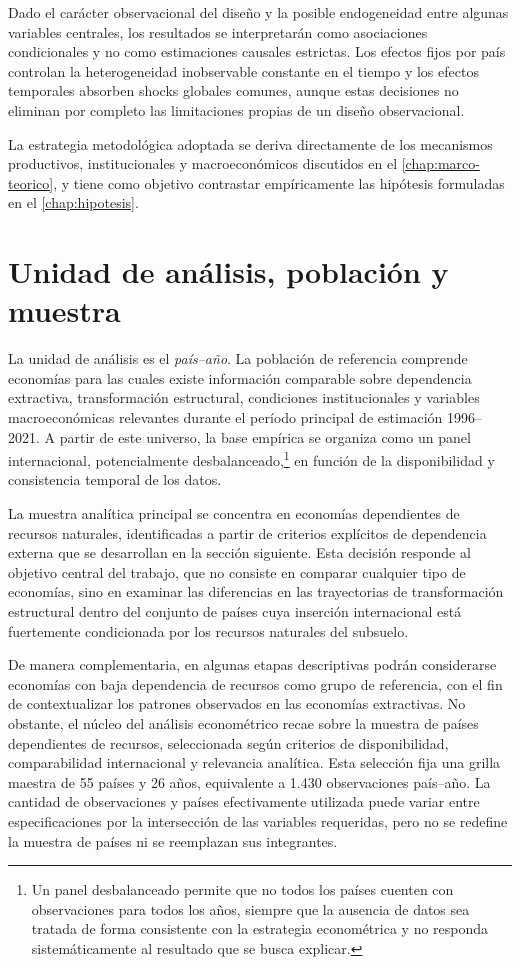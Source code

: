 \documentclass[../../TFM.tex]{subfiles}
\begin{document}
	Dado el carácter observacional del diseño y la posible endogeneidad
	entre algunas variables centrales, los resultados se interpretarán como
	asociaciones condicionales y no como estimaciones causales estrictas. Los
	efectos fijos por país controlan la heterogeneidad inobservable constante
	en el tiempo y los efectos temporales absorben shocks globales comunes,
	aunque estas decisiones no eliminan por completo las limitaciones propias
	de un diseño observacional.

	La estrategia metodológica adoptada se deriva directamente de los
	mecanismos productivos, institucionales y macroeconómicos discutidos en
	el \autoref{chap:marco-teorico}, y tiene como objetivo contrastar
	empíricamente las hipótesis formuladas en el
	\autoref{chap:hipotesis}.
	\section{Unidad de análisis, población y muestra}
	\label{sec:unidad-analisis}

	La unidad de análisis es el \emph{país--año}. La población de referencia
	comprende economías para las cuales existe información comparable sobre
	dependencia extractiva, transformación estructural, condiciones
	institucionales y variables macroeconómicas relevantes durante el período
	principal de estimación 1996--2021. A partir de este universo, la base
	empírica se organiza como un panel internacional, potencialmente
	desbalanceado,\footnote{Un panel desbalanceado permite que no todos los países cuenten con observaciones para todos los años, siempre que la ausencia de datos sea tratada de forma consistente con la estrategia econométrica y no responda sistemáticamente al resultado que se busca explicar.} en función de la
	disponibilidad y consistencia temporal de los datos.

	La muestra analítica principal se concentra en economías dependientes de
	recursos naturales, identificadas a partir de criterios explícitos de
	dependencia externa que se desarrollan en la sección siguiente. Esta
	decisión responde al objetivo central del trabajo, que no consiste en
	comparar cualquier tipo de economías, sino en examinar las diferencias en
	las trayectorias de transformación estructural dentro del conjunto de
	países cuya inserción internacional está fuertemente condicionada por los
	recursos naturales del subsuelo.

	De manera complementaria, en algunas etapas descriptivas podrán
	considerarse economías con baja dependencia de recursos como grupo de
	referencia, con el fin de contextualizar los patrones observados en las
	economías extractivas. No obstante, el núcleo del análisis econométrico
	recae sobre la muestra de países dependientes de recursos, seleccionada
	según criterios de disponibilidad, comparabilidad internacional y
	relevancia analítica. Esta selección fija una grilla maestra de 55 países y
	26 años, equivalente a 1.430 observaciones país--año. La cantidad de
	observaciones y países efectivamente utilizada puede variar entre
	especificaciones por la intersección de las variables requeridas, pero no
	se redefine la muestra de países ni se reemplazan sus integrantes.
\end{document}
